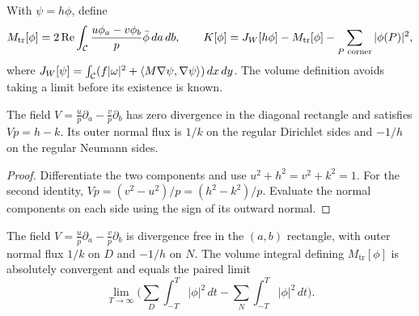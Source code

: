 \begin{definition}
\label{def:mixed-K}
\leanok
With $\psi=h\phi$, define
\[
  M_{\mathrm{tr}}[\phi]=2\operatorname{Re}\int_{\mathcal{C}}
     \frac{u\phi_a-v\phi_b}{p}\bar\phi\,da\,db,\qquad
  K[\phi]=J_W[h\phi]-M_{\mathrm{tr}}[\phi]-\sum_{P\text{ corner}}|\phi(P)|^2,
\]
where $J_W[\psi]=\int_{\mathcal{C}}(f|\omega|^2+\langle M\nabla\psi,\nabla\psi\rangle)\,dx\,dy$.
The volume definition avoids taking a limit before its existence is known.
\end{definition}

\begin{lemma}
\label{lem:mixed-trace-field}
\leanok
The field $V=\frac up\partial_a-\frac vp\partial_b$ has zero divergence in
the diagonal rectangle and satisfies $Vp=h-k$. Its outer normal flux is
$1/k$ on the regular Dirichlet sides and $-1/h$ on the regular Neumann sides.
\end{lemma}

\begin{proof}
\leanok
Differentiate the two components and use $u^2+h^2=v^2+k^2=1$.
For the second identity, $Vp=(v^2-u^2)/p=(h^2-k^2)/p$.
Evaluate the normal components on each side using the sign of its
outward normal.
\end{proof}

\begin{lemma}
\label{lem:mixed-trace-mass}
\leanok
The field $V=\frac up\partial_a-\frac vp\partial_b$ is divergence free in the
$(a,b)$ rectangle, with outer normal flux $1/k$ on $D$ and $-1/h$ on $N$.
The volume integral defining $M_{\mathrm{tr}}[\phi]$ is absolutely convergent
and equals the paired limit
\[
  \lim_{T\to\infty}\Big(\sum_D\int_{-T}^T|\phi|^2\,dt
                         -\sum_N\int_{-T}^T|\phi|^2\,dt\Big).
\]
\end{lemma}


